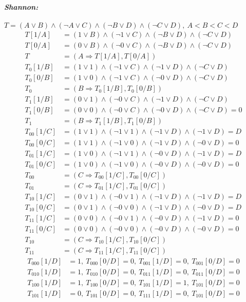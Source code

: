 \documentclass[a4paper,12pt]{article}
\begin{document}
\begin{enumerate}
	\emph{\textbf{Shannon:}}\\\\
	$T=(A\lor B)\land(\neg A\lor C)\land(\neg B\lor D)\land (\neg C\lor D),\>A<B<C<D$
	\begin{align*}
		T[1/A]&=(1\lor B)\land(\neg 1\lor C)\land(\neg B\lor D)\land (\neg C\lor D)\\
		T[0/A]&=(0\lor B)\land(\neg 0\lor C)\land(\neg B\lor D)\land (\neg C\lor D)\\
		T&=(A\Rightarrow T[1/A],T[0/A])\\
		T_0[1/B]&=(1\lor 1)\land(\neg 1\lor C)\land(\neg 1\lor D)\land (\neg C\lor D)\\
		T_0[0/B]&=(1\lor 0)\land(\neg 1\lor C)\land(\neg 0\lor D)\land (\neg C\lor D)\\
		T_0&=(B\Rightarrow T_0[1/B],T_0[0/B])\\
		T_1[1/B]&=(0\lor 1)\land(\neg 0\lor C)\land(\neg 1\lor D)\land (\neg C\lor D)\\
		T_1[0/B]&=(0\lor 0)\land(\neg 0\lor C)\land(\neg 0\lor D)\land (\neg C\lor D)=0\\
		T_1&=(B\Rightarrow T_1[1/B],T_1[0/B])\\
		T_{00}[1/C]&=(1\lor 1)\land(\neg 1\lor 1)\land(\neg 1\lor D)\land (\neg 1\lor D)=D\\
		T_{00}[0/C]&=(1\lor 1)\land(\neg 1\lor 0)\land(\neg 1\lor D)\land (\neg 0\lor D)=0\\
		T_{01}[1/C]&=(1\lor 0)\land(\neg 1\lor 1)\land(\neg 0\lor D)\land (\neg 1\lor D)=D\\
		T_{01}[0/C]&=(1\lor 0)\land(\neg 1\lor 0)\land(\neg 0\lor D)\land (\neg 0\lor D)=0\\
		T_{00}&=(C\Rightarrow T_{00}[1/C],T_{00}[0/C])\\
		T_{01}&=(C\Rightarrow T_{01}[1/C],T_{01}[0/C])\\
		T_{10}[1/C]&=(0\lor 1)\land(\neg 0\lor 1)\land(\neg 1\lor D)\land (\neg 1\lor D)=D\\
		T_{10}[0/C]&=(0\lor 1)\land(\neg 0\lor 0)\land(\neg 1\lor D)\land (\neg 0\lor D)=D\\
		T_{11}[1/C]&=(0\lor 0)\land(\neg 0\lor 1)\land(\neg 0\lor D)\land (\neg 1\lor D)=0\\
		T_{11}[0/C]&=(0\lor 0)\land(\neg 0\lor 0)\land(\neg 0\lor D)\land (\neg 0\lor D)=0\\
		T_{10}&=(C\Rightarrow T_{10}[1/C],T_{10}[0/C])\\
		T_{11}&=(C\Rightarrow T_{11}[1/C],T_{11}[0/C])
	\end{align*}
	\begin{align*}
		T_{000}[1/D]&=1,\>T_{000}[0/D]=0,\>T_{001}[1/D]=0,\>T_{001}[0/D]=0\\
		T_{010}[1/D]&=1,\>T_{010}[0/D]=0,\>T_{011}[1/D]=0,\>T_{011}[0/D]=0\\
		T_{100}[1/D]&=1,\>T_{100}[0/D]=0,\>T_{101}[1/D]=1,\>T_{101}[0/D]=0\\
		T_{101}[1/D]&=0,\>T_{101}[0/D]=0,\>T_{111}[1/D]=0,\>T_{101}[0/D]=0\\
	\end{align*}
\end{enumerate}
\end{document}
